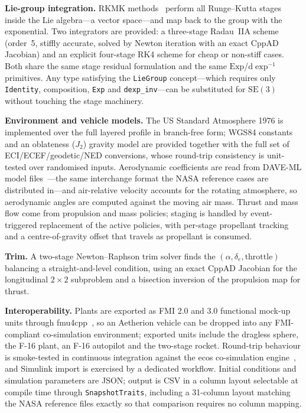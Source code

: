 \documentclass[preprint,12pt,a4paper]{elsarticle}
\newcommand{\SE}{\mathrm{SE}(3)}
\newcommand{\Exp}{\mathrm{Exp}}
\newcommand{\dexp}{\mathrm{d}\exp}
\newcommand{\code}[1]{\texttt{\small #1}}
\begin{document}
\textbf{Lie-group integration.} RKMK methods~\cite{muntheKaas1998,
iserles2000liegroup, hairerLubichWanner2006gni} perform all Runge--Kutta stages
inside the Lie algebra---a vector space---and map back to the group with the
exponential. Two integrators are provided: a three-stage Radau~IIA scheme
(order~5, stiffly accurate, solved by Newton iteration with an exact CppAD
Jacobian) and an explicit four-stage RK4 scheme for cheap or non-stiff cases.
Both share the same stage residual formulation and the same $\Exp$/$\dexp^{-1}$
primitives. Any type satisfying the \code{LieGroup} concept---which requires
only \code{Identity}, composition, \code{Exp} and \code{dexp\_inv}---can be
substituted for $\SE$ without touching the stage machinery.

\textbf{Environment and vehicle models.} The US Standard Atmosphere 1976 is
implemented over the full layered profile in branch-free form; WGS84 constants
and an oblateness ($J_2$) gravity model are provided together with the full set
of ECI/ECEF/geodetic/NED conversions, whose round-trip consistency is
unit-tested over randomised inputs. Aerodynamic coefficients are read from
DAVE-ML model files~\cite{jackson2002daveml}---the same interchange format the
NASA reference cases are distributed in---and air-relative velocity accounts
for the rotating atmosphere, so aerodynamic angles are computed against the
moving air mass. Thrust and mass flow come from propulsion and mass policies;
staging is handled by event-triggered replacement of the active policies, with
per-stage propellant tracking and a centre-of-gravity offset that travels as
propellant is consumed.

\textbf{Trim.} A two-stage Newton--Raphson trim solver finds the
$(\alpha, \delta_e, \text{throttle})$ balancing a straight-and-level condition,
using an exact CppAD Jacobian for the longitudinal $2\times2$ subproblem and a
bisection inversion of the propulsion map for thrust.

\textbf{Interoperability.} Plants are exported as FMI 2.0 and 3.0 functional
mock-up units through fmu4cpp~\cite{fmu4cpp}, so an Aetherion vehicle can be
dropped into any FMI-compliant co-simulation environment; exported units
include the dragless sphere, the F-16 plant, an F-16 autopilot and the
two-stage rocket. Round-trip behaviour is smoke-tested in continuous
integration against the ecos co-simulation engine~\cite{ecos}, and Simulink
import is exercised by a dedicated workflow. Initial conditions and simulation
parameters are JSON; output is CSV in a column layout selectable at compile
time through \code{SnapshotTraits}, including a 31-column layout matching the
NASA reference files exactly so that comparison requires no column mapping.
\end{document}
